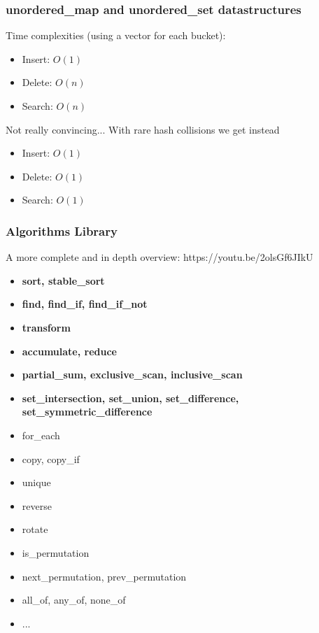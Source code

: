 \documentclass{beamer}
\begin{document}
\begin{frame}
  \frametitle{unordered\_map and unordered\_set datastructures}
  Time complexities (using a vector for each bucket):
  \begin{itemize}
    \item Insert: $O(1)$
    \item Delete: $O(n)$
    \item Search: $O(n)$
  \end{itemize}
  Not really convincing... With rare hash collisions we get instead
  \begin{itemize}
    \item Insert: $O(1)$
    \item Delete: $O(1)$
    \item Search: $O(1)$
  \end{itemize}

\end{frame}

\begin{frame}
  \frametitle{Algorithms Library}
  A more complete and in depth overview: https://youtu.be/2olsGf6JIkU
  \begin{itemize}
    \item {\bf sort, stable\_sort}
    \item {\bf find, find\_if, find\_if\_not}
    \item {\bf transform}
    \item {\bf accumulate, reduce}
    \item {\bf partial\_sum, exclusive\_scan, inclusive\_scan}
    \item {\bf set\_intersection, set\_union, set\_difference, set\_symmetric\_difference}
    \item for\_each
    \item copy, copy\_if
    \item unique
    \item reverse
    \item rotate
    \item is\_permutation
    \item next\_permutation, prev\_permutation
    \item all\_of, any\_of, none\_of
    \item ...
  \end{itemize}
\end{frame}
\end{document}
